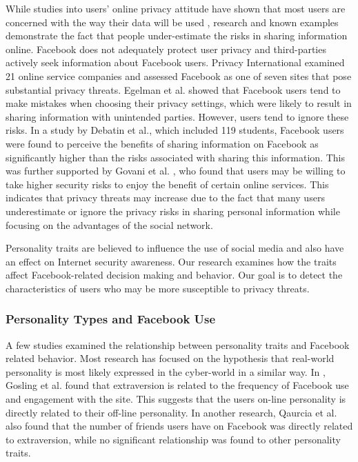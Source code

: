 \documentclass{sig-alternate}
\begin{document}
While studies into users' online privacy attitude have shown that most users are concerned with the way their data will be used \cite{ACR99, CRA99}, research and 
known examples demonstrate the fact that people under-estimate the risks in sharing information online. 
Facebook does not adequately protect user privacy and third-parties actively seek information about Facebook users. 
Privacy International \cite{PI07} 
examined 21 online service companies and assessed Facebook as 
one of seven sites that
pose substantial privacy threats. 
Egelman et al. \cite{EOK11} showed that Facebook users tend to make mistakes when choosing their privacy settings, which were likely to result in sharing information with unintended parties. 
However, users tend to ignore these risks.
In a study by Debatin et al., which included 119 students, Facebook users were found to perceive the benefits of sharing information on Facebook as significantly higher than the risks associated with sharing this information. This was further supported by 
Govani et al. \cite{GP05}, 
who
found that users may be willing to take higher security risks to enjoy the benefit of certain online services. This indicates that privacy threats may increase due to the fact that many users underestimate or ignore the privacy risks in sharing personal information while focusing on the advantages of the social network. 

Personality traits are believed to influence the use of social media and also have an effect on Internet security awareness. Our research examines how the traits affect Facebook-related decision making and behavior. Our goal is to detect the characteristics of users who may be more susceptible to privacy threats.



\subsubsection{Personality Types and Facebook Use}



A few studies examined the relationship between personality traits and Facebook related behavior. 
Most research has focused on the hypothesis that real-world personality is most likely expressed in the cyber-world in a similar way.
In \cite{GAV11}, Gosling et al.
found that extraversion is related to the frequency of Facebook use and engagement with the site. This suggests that the users on-line personality is directly related to their off-line personality.
In another research, Qaurcia et al. \cite{QLS12} also found that the number of friends users have on Facebook was directly related to extraversion, while no significant relationship was found to other personality traits. 
\end{document}
